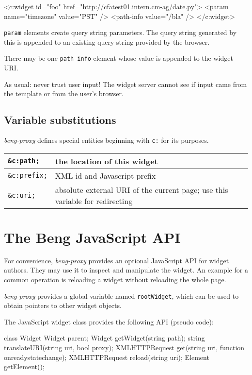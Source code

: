 \documentclass[a4paper,12pt]{article}
\begin{document}
\begin{verbatim*}
<c:widget id="foo" href="http://cfatest01.intern.cm-ag/date.py">
  <param name="timezone" value="PST" />
  <path-info value="/bla" />
</c:widget>
\end{verbatim*}

\texttt{param} elements create query string parameters.  The query
string generated by this is appended to an existing query string
provided by the browser.

There may be one \texttt{path-info} element whose value is appended to
the widget URI.

As usual: never trust user input!  The widget server cannot see if
input came from the template or from the user's browser.

\subsection{Variable substitutions}

\emph{beng-proxy} defines special entities beginning with \texttt{c:}
for its purposes.

\begin{tabular}{|l|p{8cm}|}
\hline
\texttt{\&c:path;} & the location of this widget \\
\hline
\texttt{\&c:prefix;} & XML id and Javascript prefix \\
\hline
\texttt{\&c:uri;} & absolute external URI of the current page; use
this variable for redirecting \\
\hline
\end{tabular}


\section{The Beng JavaScript API}

For convenience, \emph{beng-proxy} provides an optional JavaScript API
for widget authors.  They may use it to inspect and manipulate the
widget.  An example for a common operation is reloading a widget
without reloading the whole page.

\emph{beng-proxy} provides a global variable named
\texttt{rootWidget}, which can be used to obtain pointers to other
widget objects.

The JavaScript widget class provides the following API (pseudo code):

\begin{verbatim*}
class Widget {
  Widget parent;
  Widget getWidget(string path);
  string translateURI(string uri, bool proxy);
  XMLHTTPRequest get(string uri, function onreadystatechange);
  XMLHTTPRequest reload(string uri);
  Element getElement();
}
\end{verbatim*}
\end{document}
